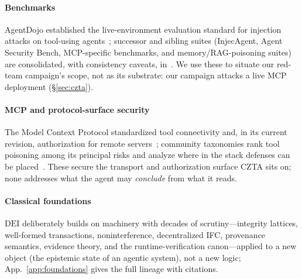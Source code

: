 \documentclass[conference]{IEEEtran}
\newcommand{\DEI}{\ensuremath{\mathrm{DEI}}}
\begin{document}
\paragraph{Benchmarks}
AgentDojo established the live-environment evaluation standard for
injection attacks on tool-using agents~\cite{agentdojo}; successor
and sibling suites (InjecAgent, Agent Security Bench, MCP-specific
benchmarks, and memory/RAG-poisoning suites) are consolidated,
with consistency caveats, in~\cite{benchtax}. We use these to
situate our red-team campaign's scope, not as its substrate: our
campaign attacks a live MCP deployment (\S\ref{sec:czta}).

\paragraph{MCP and protocol-surface security}
The Model Context Protocol standardized tool connectivity and, in
its current revision, authorization for remote
servers~\cite{mcpspec}; community taxonomies rank tool poisoning
among its principal risks and analyze where in the stack defenses
can be placed~\cite{owaspmcp,mcpdpt}. These secure the transport
and authorization surface CZTA sits on; none addresses what the
agent may \emph{conclude} from what it reads.

\paragraph{Classical foundations}
\DEI{} deliberately builds on machinery with decades of
scrutiny---integrity lattices, well-formed transactions,
noninterference, decentralized IFC, provenance semantics, evidence
theory, and the runtime-verification canon---applied to a new
object (the epistemic state of an agentic system), not a new
logic; App.~\ref{app:foundations} gives the full lineage with
citations.
\end{document}
